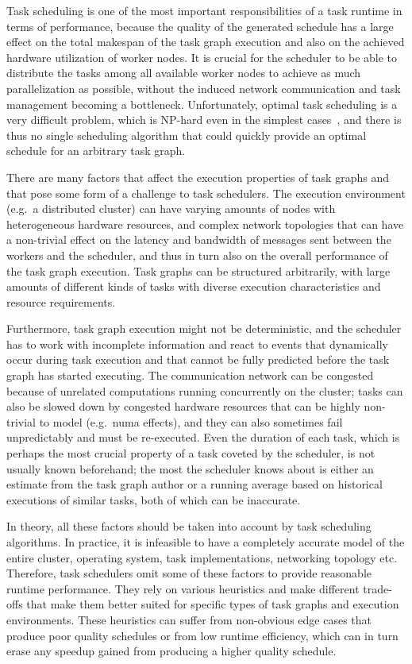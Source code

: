 Task scheduling is one of the most important responsibilities of a task runtime in terms of
performance, because the quality of the generated schedule has a large effect on the total makespan
of the task graph execution and also on the achieved hardware utilization of worker nodes. It is
crucial for the scheduler to be able to distribute the tasks among all available worker nodes to
achieve as much parallelization as possible, without the induced network communication and task
management becoming a bottleneck. Unfortunately, optimal task scheduling is a very difficult
problem, which is NP-hard even in the simplest cases~\cite{Ullman1975}, and there is thus no
single scheduling algorithm that could quickly provide an optimal schedule for an arbitrary task
graph.

There are many factors that affect the execution properties of task graphs and that pose some form
of a challenge to task schedulers. The execution environment (e.g.\ a distributed cluster) can have
varying amounts of nodes with heterogeneous hardware resources, and complex network topologies that
can have a non-trivial effect on the latency and bandwidth of messages sent between the workers and
the scheduler, and thus in turn also on the overall performance of the task graph execution. Task
graphs can be structured arbitrarily, with large amounts of different kinds of tasks with diverse
execution characteristics and resource requirements.

Furthermore, task graph execution might not be deterministic, and the scheduler has to work with
incomplete information and react to events that dynamically occur during task execution and that
cannot be fully predicted before the task graph has started executing. The communication network
can be congested because of unrelated computations running concurrently on the cluster; tasks can
also be slowed down by congested hardware resources that can be highly non-trivial to model (e.g.\
\gls{numa} effects), and they can also sometimes fail unpredictably and must be
re-executed. Even the duration of each task, which is perhaps the most crucial property of a task
coveted by the scheduler, is not usually known beforehand; the most the scheduler knows about is
either an estimate from the task graph author or a running average based on historical executions
of similar tasks, both of which can be inaccurate.

In theory, all these factors should be taken into account by task scheduling algorithms. In
practice, it is infeasible to have a completely accurate model of the entire cluster, operating
system, task implementations, networking topology etc. Therefore, task schedulers omit some of
these factors to provide reasonable runtime performance. They rely on various heuristics and make
different trade-offs that make them better suited for specific types of task graphs and execution
environments. These heuristics can suffer from non-obvious edge cases that produce poor quality
schedules or from low runtime efficiency, which can in turn erase any speedup gained from producing
a higher quality schedule.

